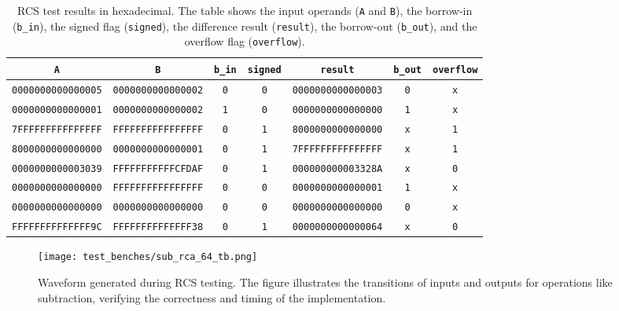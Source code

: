 \documentclass[12pt]{article}
\begin{document}
\begin{table}[ht!]
    \centering
    \renewcommand{\arraystretch}{1.1}
    \setlength{\tabcolsep}{2pt}
    \begin{tabular}{|c|c|c|c|c|c|c|}
        \hline
        \texttt{A} & \texttt{B} & \texttt{b\_in} & \texttt{signed} & \texttt{result} & \texttt{b\_out} & \texttt{overflow} \\
        \hline
        \texttt{0000000000000005} & \texttt{0000000000000002} & \texttt{0} & \texttt{0} & \texttt{0000000000000003} & \texttt{0} & \texttt{x} \\
        \texttt{0000000000000001} & \texttt{0000000000000002} & \texttt{1} & \texttt{0} & \texttt{0000000000000000} & \texttt{1} & \texttt{x} \\
        \texttt{7FFFFFFFFFFFFFFF} & \texttt{FFFFFFFFFFFFFFFF} & \texttt{0} & \texttt{1} & \texttt{8000000000000000} & \texttt{x} & \texttt{1} \\
        \texttt{8000000000000000} & \texttt{0000000000000001} & \texttt{0} & \texttt{1} & \texttt{7FFFFFFFFFFFFFFF} & \texttt{x} & \texttt{1} \\
        \texttt{0000000000003039} & \texttt{FFFFFFFFFFFCFDAF} & \texttt{0} & \texttt{1} & \texttt{000000000003328A} & \texttt{x} & \texttt{0} \\
        \texttt{0000000000000000} & \texttt{FFFFFFFFFFFFFFFF} & \texttt{0} & \texttt{0} & \texttt{0000000000000001} & \texttt{1} & \texttt{x} \\
        \texttt{0000000000000000} & \texttt{0000000000000000} & \texttt{0} & \texttt{0} & \texttt{0000000000000000} & \texttt{0} & \texttt{x} \\
        \texttt{FFFFFFFFFFFFFF9C} & \texttt{FFFFFFFFFFFFFF38} & \texttt{0} & \texttt{1} & \texttt{0000000000000064} & \texttt{x} & \texttt{0} \\
        \hline
    \end{tabular}
    \caption{RCS test results in hexadecimal. The table shows the input operands (\texttt{A} and \texttt{B}), the borrow-in (\texttt{b\_in}), the signed flag (\texttt{signed}), the difference result (\texttt{result}), the borrow-out (\texttt{b\_out}), and the overflow flag (\texttt{overflow}).}
    \label{tab:subtractor_results}
\end{table}

\begin{figure}[ht!]
    \centering
    \texttt{[image: test\_benches/sub\_rca\_64\_tb.png]}
    \caption{Waveform generated during RCS testing. The figure illustrates the transitions of inputs and outputs for operations like subtraction, verifying the correctness and timing of the implementation.}
    \label{fig:subtractor_waveform}
\end{figure}
\end{document}
